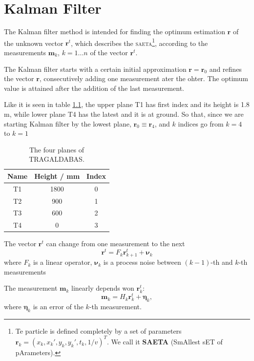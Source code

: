 \documentclass[a4paper]{book}
\let\vec\mathbf  %
\begin{document}
\chapter{Kalman Filter}

The Kalman filter method is intended for finding the optimum estimation $\vec{r}$ of the unknown vector $\vec{r}^t$, which describes the \textsc{saeta}\footnote{Te particle is defined completely by a set of parameters $\vec{r}_k = (x_k, x_k', y_k, y_k', t_k, 1/v)^T$. We call it \textbf{SAETA} (SmAllest sET of pArameters).}, according to the measurements $\vec{m}_k$, $k = 1 ... n$ of the vector $\vec{r}^t$.

The Kalman filter starts with a certain initial approximation $\vec{r} = \vec{r}_0$ and refines the vector $\vec{r}$, consecutively adding one measurement ater the ohter. The optimum value is attained after the addition of the last measurement.

Like it is seen in table \ref{tb:planes}, the upper plane T1 has first index and its height is 1.8 m, while lower plane T4 has the latest and it is at ground. So that, since we are starting Kalman filter by the lowest plane, $\vec{r}_0 \equiv \vec{r}_4$, and $k$ indices go from $k=4$ to $k=1$

\begin{table}[h!]
\centering
\begin{tabular}{@{}ccc@{}}
\toprule
Name & Height / mm & Index \\ \midrule
T1   & 1800        & 0     \\
T2   & 900         & 1     \\
T3   & 600         & 2     \\
T4   & 0           & 3     \\ \bottomrule
\end{tabular}
\caption{The four planes of TRAGALDABAS.}
\label{tb:planes}
\end{table}

The vector $\vec{r}^t$ can change from one measurement to the next
\begin{equation}
\vec{r}^t = F_k \vec{r}^t_{k+1} + \boldsymbol\nu_k 
\label{eq:rtk}
\end{equation}
where $F_k$ is a linear operator, $\boldsymbol\nu_k$ is a process noise between $(k -1)$-th and $k$-th measurements

The measurement $\vec{m}_k$ linearly depends won $\vec{r}^t_k$:
\begin{equation}
\vec{m}_k = H_k \vec{r}^t_k + \boldsymbol\eta_k,
\label{eq:mk}
\end{equation}
where $\boldsymbol\eta_k$ is an error of the $k$-th measurement.
\end{document}
